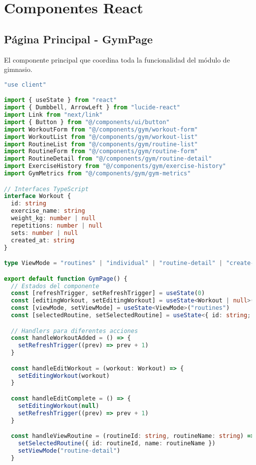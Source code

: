 \documentclass[12pt,a4paper]{article}
\begin{document}
\section{Componentes React}

\subsection{Página Principal - GymPage}

El componente principal que coordina toda la funcionalidad del módulo de gimnasio.

\begin{lstlisting}[language=typescript, caption=app/gym/page.tsx - Estructura completa]
"use client"

import { useState } from "react"
import { Dumbbell, ArrowLeft } from "lucide-react"
import Link from "next/link"
import { Button } from "@/components/ui/button"
import WorkoutForm from "@/components/gym/workout-form"
import WorkoutList from "@/components/gym/workout-list"
import RoutineList from "@/components/gym/routine-list"
import RoutineForm from "@/components/gym/routine-form"
import RoutineDetail from "@/components/gym/routine-detail"
import ExerciseHistory from "@/components/gym/exercise-history"
import GymMetrics from "@/components/gym/gym-metrics"

// Interfaces TypeScript
interface Workout {
  id: string
  exercise_name: string
  weight_kg: number | null
  repetitions: number | null
  sets: number | null
  created_at: string
}

type ViewMode = "routines" | "individual" | "routine-detail" | "create-routine" | "history" | "metrics"

export default function GymPage() {
  // Estados del componente
  const [refreshTrigger, setRefreshTrigger] = useState(0)
  const [editingWorkout, setEditingWorkout] = useState<Workout | null>(null)
  const [viewMode, setViewMode] = useState<ViewMode>("routines")
  const [selectedRoutine, setSelectedRoutine] = useState<{ id: string; name: string } | null>(null)

  // Handlers para diferentes acciones
  const handleWorkoutAdded = () => {
    setRefreshTrigger((prev) => prev + 1)
  }

  const handleEditWorkout = (workout: Workout) => {
    setEditingWorkout(workout)
  }

  const handleEditComplete = () => {
    setEditingWorkout(null)
    setRefreshTrigger((prev) => prev + 1)
  }

  const handleViewRoutine = (routineId: string, routineName: string) => {
    setSelectedRoutine({ id: routineId, name: routineName })
    setViewMode("routine-detail")
  }


\end{lstlisting}
\end{document}
